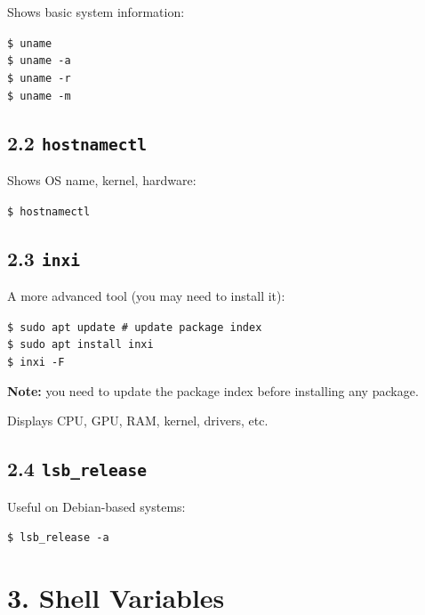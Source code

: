 \documentclass[12pt]{article}
\begin{document}
Shows basic system information:

\begin{highlightbox}
\texttt{\$ uname}\\
\texttt{\$ uname -a}\\
\texttt{\$ uname -r}\\
\texttt{\$ uname -m}
\end{highlightbox}

\subsection*{2.2 \texttt{hostnamectl}}

Shows OS name, kernel, hardware:

\begin{highlightbox}
\texttt{\$ hostnamectl}
\end{highlightbox}

\subsection*{2.3 \texttt{inxi}}

A more advanced tool (you may need to install it):

\begin{highlightbox}
\texttt{\$ sudo apt update \# update package index}\\
\texttt{\$ sudo apt install inxi}\\
\texttt{\$ inxi -F}
\end{highlightbox}

\begin{infobox}
\textbf{Note:} you need to update the package index before installing any package.
\end{infobox}

Displays CPU, GPU, RAM, kernel, drivers, etc.

\subsection*{2.4 \texttt{lsb\_release}}

Useful on Debian-based systems:

\begin{highlightbox}
\texttt{\$ lsb\_release -a}
\end{highlightbox}

\section*{3. Shell Variables}
\end{document}
